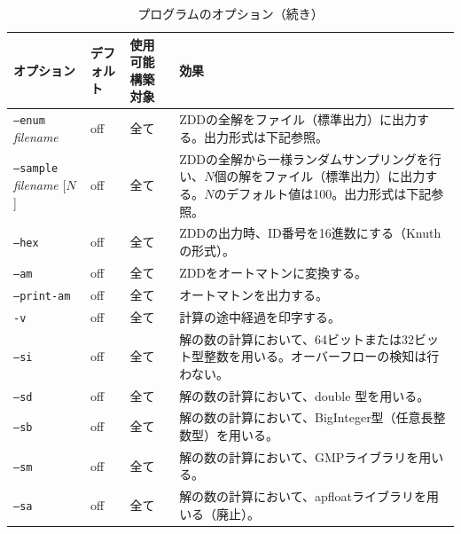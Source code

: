 \documentclass{jsarticle}
\begin{document}
\begin{table}
\caption{プログラムのオプション（続き）}
\label{tab:option3}
\begin{center}
\begin{tabular}[t]{|p{120pt}|p{50pt}|p{80pt}|p{180pt}|}
\hline%
オプション & デフォルト & 使用可能構築対象 & 効果 \\ \hline \hline
\texttt{--enum} \textit{filename} & off & 全て & ZDDの全解をファイル（標準出力）に出力する。出力形式は下記参照。 \\ \hline
\texttt{--sample} \textit{filename} [$N$] & off & 全て & ZDDの全解から一様ランダムサンプリングを行い、$N$個の解をファイル（標準出力）に出力する。$N$のデフォルト値は100。出力形式は下記参照。 \\ \hline
\texttt{--hex} & off & 全て & ZDDの出力時、ID番号を16進数にする（Knuth の形式）。 \\ \hline
\texttt{--am} & off & 全て & ZDDをオートマトンに変換する。\\ \hline
\texttt{--print-am} & off & 全て & オートマトンを出力する。 \\ \hline
\texttt{-v} & off & 全て & 計算の途中経過を印字する。\\ \hline
\texttt{--si} & off & 全て & 解の数の計算において、64ビットまたは32ビット型整数を用いる。オーバーフローの検知は行わない。\\ \hline
\texttt{--sd} & off & 全て & 解の数の計算において、double 型を用いる。\\ \hline
\texttt{--sb} & off & 全て & 解の数の計算において、BigInteger型（任意長整数型）を用いる。\\ \hline
\texttt{--sm} & off & 全て & 解の数の計算において、GMPライブラリを用いる。\\ \hline
\texttt{--sa} & off & 全て & 解の数の計算において、apfloatライブラリを用いる（廃止）。\\ \hline
\end{tabular}
\end{center}
\end{table}
\end{document}
